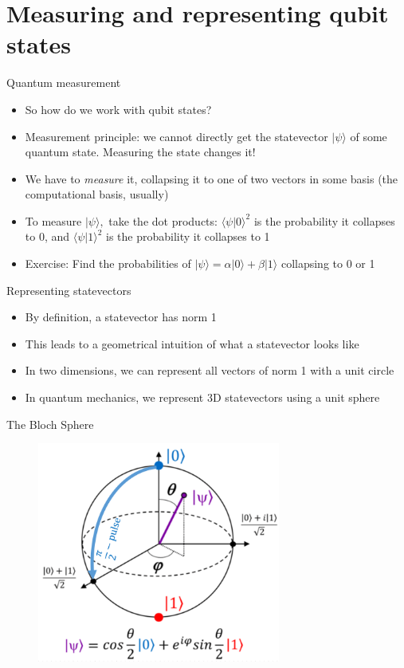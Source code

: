 \documentclass[aspectratio=169]{beamer}
\begin{document}
\section{Measuring and representing qubit states}

\begin{frame}{Quantum measurement}
    \begin{itemize}
        \item So how do we work with qubit states? \pause
        \item Measurement principle: we cannot directly get the statevector $|\psi \rangle$ of some quantum state. Measuring the state changes it! \pause
        \item We have to \textit{measure} it, collapsing it to one of two vectors in some basis (the computational basis, usually) \pause
        \item To measure $|\psi \rangle,$ take the dot products: $\langle \psi | 0 \rangle ^2$ is the probability it collapses to 0, and $\langle \psi | 1 \rangle ^2$ is the probability it collapses to 1 \pause
        \item \textcolor{sigma@alertred}{Exercise:} Find the probabilities of $|\psi \rangle = \alpha|0\rangle + \beta|1\rangle$ collapsing to 0 or 1
    \end{itemize}
\end{frame}

\begin{frame}{Representing statevectors}
    \begin{itemize}
        \item By definition, a statevector has norm 1 \pause
        \item This leads to a geometrical intuition of what a statevector looks like \pause
        \item In two dimensions, we can represent all vectors of norm 1 with a unit circle \pause
        \item In quantum mechanics, we represent 3D statevectors using a unit sphere
    \end{itemize}
\end{frame}

\begin{frame}{The Bloch Sphere}
    \begin{figure}
        \includegraphics[width=8cm]{Bloch.png}
    \end{figure}
\end{frame}
\end{document}
